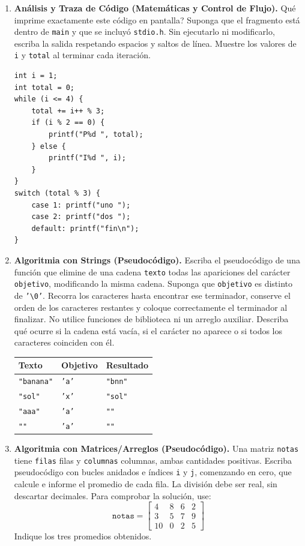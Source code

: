 \documentclass[11pt,letterpaper]{article}
\begin{document}
\begin{enumerate}[label=\textbf{\arabic*.}]
    \newpage
    \item \textbf{Análisis y Traza de Código (Matemáticas y Control de Flujo).}
    \textquestiondown{}Qué imprime exactamente este código en pantalla? Suponga que el fragmento está dentro de \texttt{main} y que se incluyó \texttt{stdio.h}. Sin ejecutarlo ni modificarlo, escriba la salida respetando espacios y saltos de línea. Muestre los valores de \texttt{i} y \texttt{total} al terminar cada iteración.
    \begin{lstlisting}[style=customc]
int i = 1;
int total = 0;
while (i <= 4) {
    total += i++ % 3;
    if (i % 2 == 0) {
        printf("P%d ", total);
    } else {
        printf("I%d ", i);
    }
}
switch (total % 3) {
    case 1: printf("uno ");
    case 2: printf("dos ");
    default: printf("fin\n");
}
    \end{lstlisting}

    \newpage
    \item \textbf{Algoritmia con Strings (Pseudocódigo).}
    Escriba el pseudocódigo de una función que elimine de una cadena \texttt{texto} todas las apariciones del carácter \texttt{objetivo}, modificando la misma cadena. Suponga que \texttt{objetivo} es distinto de \texttt{'\textbackslash 0'}. Recorra los caracteres hasta encontrar ese terminador, conserve el orden de los caracteres restantes y coloque correctamente el terminador al finalizar. No utilice funciones de biblioteca ni un arreglo auxiliar. Describa qué ocurre si la cadena está vacía, si el carácter no aparece o si todos los caracteres coinciden con él.
    \begin{center}
    \begin{tabular}{lll}
    \toprule
    \textbf{Texto} & \textbf{Objetivo} & \textbf{Resultado} \\
    \midrule
    \texttt{"banana"} & \texttt{'a'} & \texttt{"bnn"} \\
    \texttt{"sol"} & \texttt{'x'} & \texttt{"sol"} \\
    \texttt{"aaa"} & \texttt{'a'} & \texttt{""} \\
    \texttt{""} & \texttt{'a'} & \texttt{""} \\
    \bottomrule
    \end{tabular}
    \end{center}

    \newpage
    \item \textbf{Algoritmia con Matrices/Arreglos (Pseudocódigo).}
    Una matriz \texttt{notas} tiene \texttt{filas} filas y \texttt{columnas} columnas, ambas cantidades positivas. Escriba pseudocódigo con bucles anidados e índices \texttt{i} y \texttt{j}, comenzando en cero, que calcule e informe el promedio de cada fila. La división debe ser real, sin descartar decimales. Para comprobar la solución, use:
    \[
    \texttt{notas} =
    \begin{bmatrix}
    4 & 8 & 6 & 2 \\
    3 & 5 & 7 & 9 \\
    10 & 0 & 2 & 5
    \end{bmatrix}
    \]
    Indique los tres promedios obtenidos.
\end{enumerate}
\end{document}
